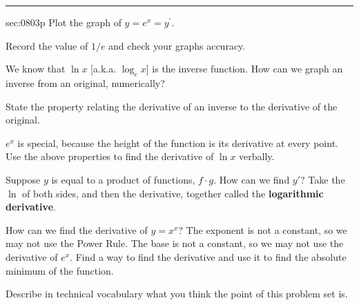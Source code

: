 \renewcommand{\columnseprule}{1.5pt}
\begin{multicols*}{2}
\rule[0.5\baselineskip]{0.4\textwidth}{1pt}
\noindent
{}\label{sec:0803p}
\begin{exercises}{sec:0803p}
\lab{} Plot the graph of $y = e^x = y^\prime$.

\noindent
\begin{centering}
\end{centering}


\lab{} Record the value of $1/e$ and check your graphs accuracy.

\vspace{2cm}
\lab{} We know that $\ln{x}$ [a.k.a. $\log_e{x}$] is the inverse function.  How can we graph an inverse from an original, numerically?


\vspace{2cm}
\lab{} State the property relating the derivative of an inverse to the derivative of the original.

\vspace{2cm}
\lab{} $e^x$ is special, because the height of the function is its derivative at every point.  Use the above properties to find the derivative of $\ln{x}$ verbally.

\vspace{2cm}
\lab{} Suppose $y$ is equal to a product of functions, $f\cdot{}g$.  How can we find $y\prime$?  Take the $\ln{}$ of both sides, and then the derivative, together called the \textbf{logarithmic derivative}.

\vspace{4cm}
\lab{} How can we find the derivative of $y = x^x$?  The exponent is not a constant, so we may not use the Power Rule.  The base is not a constant, so we may not use the derivative of $e^x$.  Find a way to find the derivative and use it to find the absolute minimum of the function.

\vspace{4cm}
\lab{} Describe in technical vocabulary what you think the point of this problem set is.

\end{exercises}
\end{multicols*}